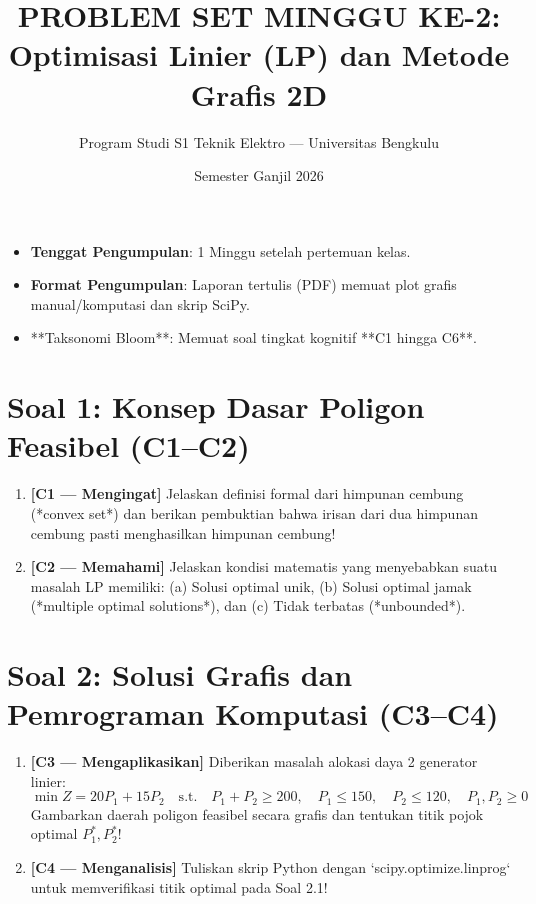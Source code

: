 \documentclass[11pt,a4paper]{article}
\title{\vspace{-1cm}\textbf{PROBLEM SET MINGGU KE-2:}\\Optimisasi Linier (LP) dan Metode Grafis 2D}
\author{Program Studi S1 Teknik Elektro --- Universitas Bengkulu}
\date{Semester Ganjil 2026}
\begin{document}
\maketitle

\begin{tcolorbox}[colback=unibgold!10,colframe=unibgold!80!black,title=\textbf{Petunjuk Pengerjaan dan Tenggat Waktu}]
\begin{itemize}[leftmargin=*]
    \item \textbf{Tenggat Pengumpulan}: 1 Minggu setelah pertemuan kelas.
    \item \textbf{Format Pengumpulan}: Laporan tertulis (PDF) memuat plot grafis manual/komputasi dan skrip SciPy.
    \item **Taksonomi Bloom**: Memuat soal tingkat kognitif **C1 hingga C6**.
\end{itemize}
\end{tcolorbox}

\vspace{0.3cm}

\section*{Soal 1: Konsep Dasar Poligon Feasibel (C1--C2)}

\begin{enumerate}[label=\textbf{1.\arabic*}, leftmargin=*]
    \item \textbf{[C1 --- Mengingat]} Jelaskan definisi formal dari himpunan cembung (*convex set*) dan berikan pembuktian bahwa irisan dari dua himpunan cembung pasti menghasilkan himpunan cembung!
    
    \item \textbf{[C2 --- Memahami]} Jelaskan kondisi matematis yang menyebabkan suatu masalah LP memiliki: (a) Solusi optimal unik, (b) Solusi optimal jamak (*multiple optimal solutions*), dan (c) Tidak terbatas (*unbounded*).
\end{enumerate}

\section*{Soal 2: Solusi Grafis dan Pemrograman Komputasi (C3--C4)}

\begin{enumerate}[label=\textbf{2.\arabic*}, leftmargin=*]
    \item \textbf{[C3 --- Mengaplikasikan]} Diberikan masalah alokasi daya 2 generator linier:
    \[
        \min Z = 20 P_1 + 15 P_2 \quad \text{s.t.} \quad P_1 + P_2 \ge 200, \quad P_1 \le 150, \quad P_2 \le 120, \quad P_1, P_2 \ge 0
    \]
    Gambarkan daerah poligon feasibel secara grafis dan tentukan titik pojok optimal $P_1^*, P_2^*$!

    \item \textbf{[C4 --- Menganalisis]} Tuliskan skrip Python dengan `scipy.optimize.linprog` untuk memverifikasi titik optimal pada Soal 2.1!
\end{enumerate}
\end{document}
